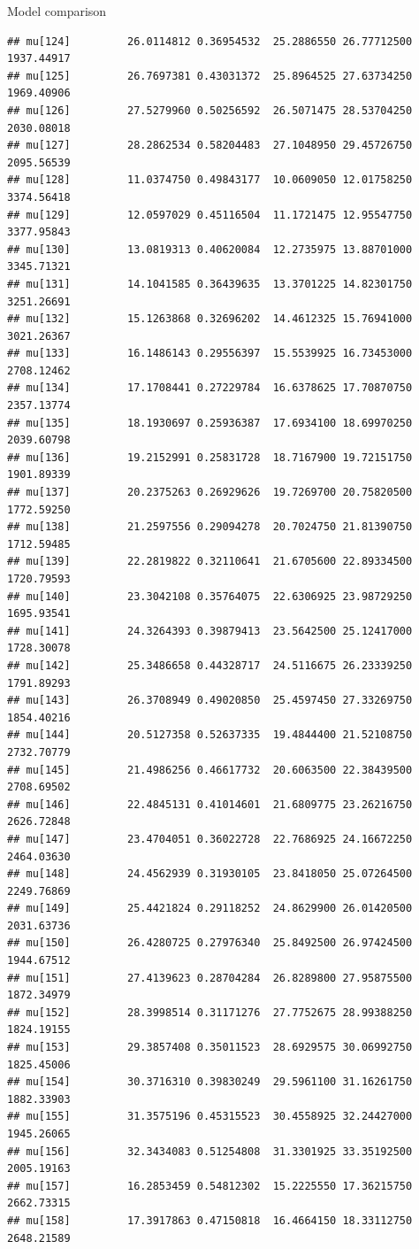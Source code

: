 \documentclass[
  ignorenonframetext,
]{beamer}
\begin{document}
\begin{frame}[fragile]{Model comparison}
\begin{verbatim}
## mu[124]         26.0114812 0.36954532  25.2886550 26.77712500 1937.44917
## mu[125]         26.7697381 0.43031372  25.8964525 27.63734250 1969.40906
## mu[126]         27.5279960 0.50256592  26.5071475 28.53704250 2030.08018
## mu[127]         28.2862534 0.58204483  27.1048950 29.45726750 2095.56539
## mu[128]         11.0374750 0.49843177  10.0609050 12.01758250 3374.56418
## mu[129]         12.0597029 0.45116504  11.1721475 12.95547750 3377.95843
## mu[130]         13.0819313 0.40620084  12.2735975 13.88701000 3345.71321
## mu[131]         14.1041585 0.36439635  13.3701225 14.82301750 3251.26691
## mu[132]         15.1263868 0.32696202  14.4612325 15.76941000 3021.26367
## mu[133]         16.1486143 0.29556397  15.5539925 16.73453000 2708.12462
## mu[134]         17.1708441 0.27229784  16.6378625 17.70870750 2357.13774
## mu[135]         18.1930697 0.25936387  17.6934100 18.69970250 2039.60798
## mu[136]         19.2152991 0.25831728  18.7167900 19.72151750 1901.89339
## mu[137]         20.2375263 0.26929626  19.7269700 20.75820500 1772.59250
## mu[138]         21.2597556 0.29094278  20.7024750 21.81390750 1712.59485
## mu[139]         22.2819822 0.32110641  21.6705600 22.89334500 1720.79593
## mu[140]         23.3042108 0.35764075  22.6306925 23.98729250 1695.93541
## mu[141]         24.3264393 0.39879413  23.5642500 25.12417000 1728.30078
## mu[142]         25.3486658 0.44328717  24.5116675 26.23339250 1791.89293
## mu[143]         26.3708949 0.49020850  25.4597450 27.33269750 1854.40216
## mu[144]         20.5127358 0.52637335  19.4844400 21.52108750 2732.70779
## mu[145]         21.4986256 0.46617732  20.6063500 22.38439500 2708.69502
## mu[146]         22.4845131 0.41014601  21.6809775 23.26216750 2626.72848
## mu[147]         23.4704051 0.36022728  22.7686925 24.16672250 2464.03630
## mu[148]         24.4562939 0.31930105  23.8418050 25.07264500 2249.76869
## mu[149]         25.4421824 0.29118252  24.8629900 26.01420500 2031.63736
## mu[150]         26.4280725 0.27976340  25.8492500 26.97424500 1944.67512
## mu[151]         27.4139623 0.28704284  26.8289800 27.95875500 1872.34979
## mu[152]         28.3998514 0.31171276  27.7752675 28.99388250 1824.19155
## mu[153]         29.3857408 0.35011523  28.6929575 30.06992750 1825.45006
## mu[154]         30.3716310 0.39830249  29.5961100 31.16261750 1882.33903
## mu[155]         31.3575196 0.45315523  30.4558925 32.24427000 1945.26065
## mu[156]         32.3434083 0.51254808  31.3301925 33.35192500 2005.19163
## mu[157]         16.2853459 0.54812302  15.2225550 17.36215750 2662.73315
## mu[158]         17.3917863 0.47150818  16.4664150 18.33112750 2648.21589

\end{verbatim}
\end{frame}
\end{document}
